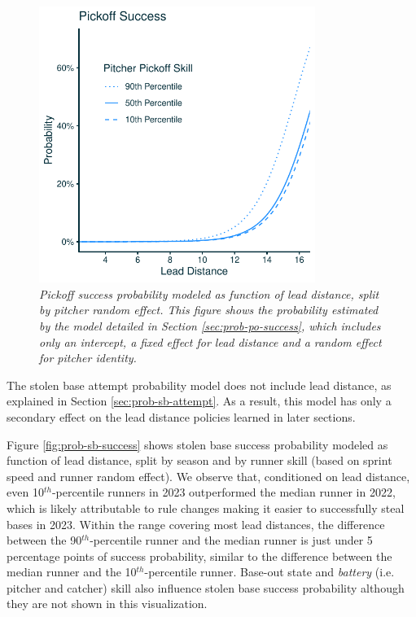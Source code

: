 \documentclass{article}
\begin{document}
      \begin{figure}
        \centering
        \includegraphics[width = 0.8\textwidth]{../../output/figures/prob_po_success_light.pdf}
        \caption{
          \it Pickoff success probability modeled as function of lead distance, split by pitcher random effect. This figure shows the probability estimated by the model detailed in Section \ref{sec:prob-po-success}, which includes only an intercept, a fixed effect for lead distance and a random effect for pitcher identity.
        }
        \label{fig:prob-pickoff-success}
      \end{figure}

      The stolen base attempt probability model does not include lead distance, as explained in Section \ref{sec:prob-sb-attempt}. As a result, this model has only a secondary effect on the lead distance policies learned in later sections.

      Figure \ref{fig:prob-sb-success} shows stolen base success probability modeled as function of lead distance, split by season and by runner skill (based on sprint speed and runner random effect). We observe that, conditioned on lead distance, even 10$^{th}$-percentile runners in 2023 outperformed the median runner in 2022, which is likely attributable to rule changes making it easier to successfully steal bases in 2023. Within the range covering most lead distances, the difference between the 90$^{th}$-percentile runner and the median runner is just under 5 percentage points of success probability, similar to the difference between the median runner and the 10$^{th}$-percentile runner. Base-out state and {\it battery} (i.e. pitcher and catcher) skill also influence stolen base success probability although they are not shown in this visualization.
      
\end{document}
